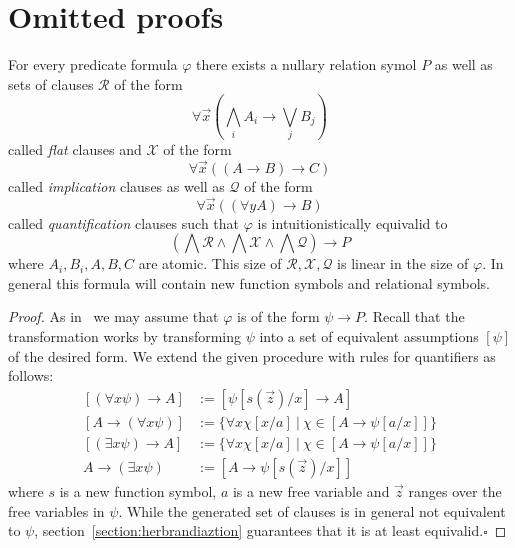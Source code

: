 \documentclass[runningheads]{llncs}
\begin{document}
\appendix

\section{Omitted proofs}

\begin{lemma}\label{proof:first-order-normal-form}
	For every predicate formula $\varphi$ there exists a nullary relation symol $P$ as well as sets of clauses $\mathcal R$ of the form
	$$\forall \vec x\left(\bigwedge_i A_i\to \bigvee_j B_j\right)$$
	called \emph{flat} clauses and $\mathcal X$ of the form
	$$\forall \vec x\left((A\to B)\to C\right)$$
	called \emph{implication} clauses as well as $\mathcal Q$ of the form
	$$\forall\vec x\left((\forall y A)\to B\right)$$
	called \emph{quantification} clauses such that $\varphi$ is intuitionistically equivalid to
	$$\left(\bigwedge\mathcal R\wedge\bigwedge \mathcal X\wedge\bigwedge\mathcal Q\right)\to P$$where $A_i, B_i, A, B, C$ are atomic. This size of $\mathcal R, \mathcal X, \mathcal Q$ is linear in the size of $\varphi$. In general this formula will contain new function symbols and relational symbols.
\end{lemma}

\begin{proof}
	As in~\cite{otten2005clausal} we may assume that $\varphi$ is of the form $\psi\to P$. Recall that the transformation works by transforming $\psi$ into a set of equivalent assumptions $\left\lbrack \psi\right\rbrack$ of the desired form. We extend the given procedure with rules for quantifiers as follows:
	\begin{align*}
		\left\lbrack(\forall x \psi)\to A\right\rbrack&:= \left\lbrack\psi[s(\vec z)/x]\to A\right\rbrack\\
		\left\lbrack A\to (\forall x\psi)\right\rbrack&:= \{\forall x\chi[x/a]\:|\:\chi\in\left\lbrack A\to\psi[a/x]\right\rbrack\}\\
		\left\lbrack(\exists x\psi)\to A\right\rbrack&:= \{\forall x\chi[x/a]\:|\:\chi\in\left\lbrack A\to\psi[a/x]\right\rbrack\}\\
		A\to (\exists x\psi)&:= \left\lbrack A\to\psi[s(\vec z)/x]\right\rbrack
	\end{align*}
	where $s$ is a new function symbol, $a$ is a new free variable and $\vec z$ ranges over the free variables in $\psi$.
	While the generated set of clauses is in general not equivalent to $\psi$, section~\ref{section:herbrandiaztion} guarantees that it is at least equivalid.\hfill$\square$
\end{proof}
\end{document}

